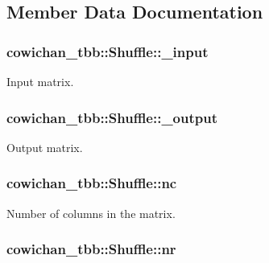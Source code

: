 \subsection{Member Data Documentation}
\hypertarget{classcowichan__tbb_1_1_shuffle_c4b8c943de6b9cf612aa86ec9fc8a5c4}{
\subsubsection[{\_\-input}]{ {\bf cowichan\_\-tbb::Shuffle::\_\-input}}}
\label{classcowichan__tbb_1_1_shuffle_c4b8c943de6b9cf612aa86ec9fc8a5c4}


Input matrix. \hypertarget{classcowichan__tbb_1_1_shuffle_e176ad327a461904b6a4e7bc5e0cff97}{
\subsubsection[{\_\-output}]{ {\bf cowichan\_\-tbb::Shuffle::\_\-output}}}
\label{classcowichan__tbb_1_1_shuffle_e176ad327a461904b6a4e7bc5e0cff97}


Output matrix. \hypertarget{classcowichan__tbb_1_1_shuffle_c8e1f9b9f2c51041c677fbd98bc08e17}{
\subsubsection[{nc}]{ {\bf cowichan\_\-tbb::Shuffle::nc}}}
\label{classcowichan__tbb_1_1_shuffle_c8e1f9b9f2c51041c677fbd98bc08e17}


Number of columns in the matrix. \hypertarget{classcowichan__tbb_1_1_shuffle_45a3363e8d41126dbbe70b6dc491f210}{
\subsubsection[{nr}]{ {\bf cowichan\_\-tbb::Shuffle::nr}}}
\label{classcowichan__tbb_1_1_shuffle_45a3363e8d41126dbbe70b6dc491f210}


